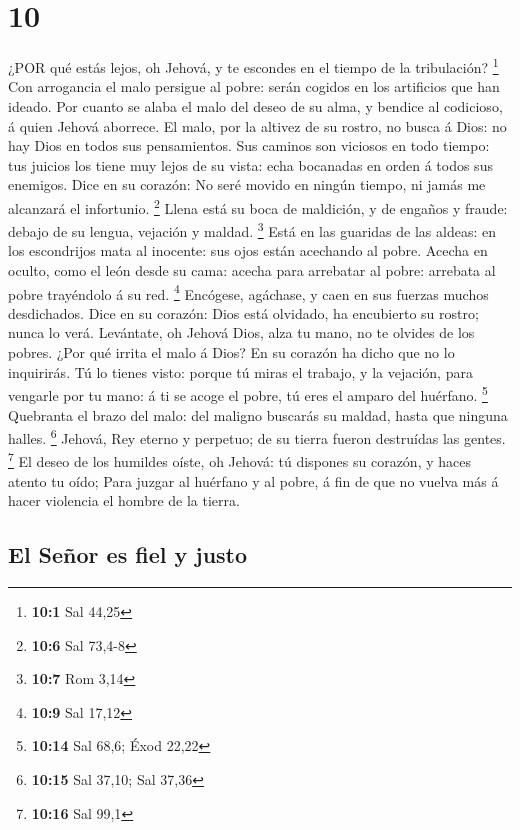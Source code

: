 \hypertarget{section-9}{%
\section{10}\label{section-9}}

 ¿POR qué estás lejos, oh Jehová, y te escondes en el tiempo
de la tribulación? \footnote{\textbf{10:1} Sal 44,25}  Con
arrogancia el malo persigue al pobre: serán cogidos en los artificios
que han ideado.  Por cuanto se alaba el malo del deseo de su
alma, y bendice al codicioso, á quien Jehová aborrece.  El
malo, por la altivez de su rostro, no busca á Dios: no hay Dios en todos
sus pensamientos.  Sus caminos son viciosos en todo tiempo:
tus juicios los tiene muy lejos de su vista: echa bocanadas en orden á
todos sus enemigos.  Dice en su corazón: No seré movido en
ningún tiempo, ni jamás me alcanzará el infortunio. \footnote{\textbf{10:6}
  Sal 73,4-8}  Llena está su boca de maldición, y de engaños
y fraude: debajo de su lengua, vejación y maldad. \footnote{\textbf{10:7}
  Rom 3,14}  Está en las guaridas de las aldeas: en los
escondrijos mata al inocente: sus ojos están acechando al pobre.
 Acecha en oculto, como el león desde su cama: acecha para
arrebatar al pobre: arrebata al pobre trayéndolo á su red. \footnote{\textbf{10:9}
  Sal 17,12}  Encógese, agáchase, y caen en sus fuerzas
muchos desdichados.  Dice en su corazón: Dios está
olvidado, ha encubierto su rostro; nunca lo verá. 
Levántate, oh Jehová Dios, alza tu mano, no te olvides de los pobres.
 ¿Por qué irrita el malo á Dios? En su corazón ha dicho que
no lo inquirirás.  Tú lo tienes visto: porque tú miras el
trabajo, y la vejación, para vengarle por tu mano: á ti se acoge el
pobre, tú eres el amparo del huérfano. \footnote{\textbf{10:14} Sal
  68,6; Éxod 22,22}  Quebranta el brazo del malo: del
maligno buscarás su maldad, hasta que ninguna halles. \footnote{\textbf{10:15}
  Sal 37,10; Sal 37,36}  Jehová, Rey eterno y perpetuo; de
su tierra fueron destruídas las gentes. \footnote{\textbf{10:16} Sal
  99,1}  El deseo de los humildes oíste, oh Jehová: tú
dispones su corazón, y haces atento tu oído;  Para juzgar
al huérfano y al pobre, á fin de que no vuelva más á hacer violencia el
hombre de la tierra.

\hypertarget{el-seuxf1or-es-fiel-y-justo}{%
\subsection{El Señor es fiel y
justo}\label{el-seuxf1or-es-fiel-y-justo}}


